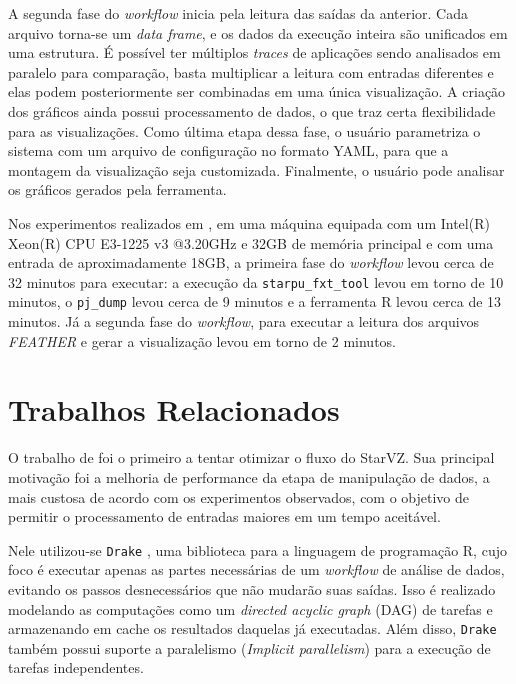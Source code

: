 A segunda fase do \emph{workflow} inicia pela leitura das saídas da anterior. 
Cada arquivo
torna-se um \emph{data frame}, e os dados da execução inteira são unificados em 
uma estrutura.
É possível ter múltiplos \emph{traces} de aplicações sendo analisados em 
paralelo
para comparação, basta multiplicar a leitura com entradas diferentes e 
elas podem posteriormente ser combinadas em uma única visualização. A criação 
dos gráficos ainda 
possui processamento de dados, o que traz certa flexibilidade para as 
visualizações. Como última etapa dessa fase, o usuário 
parametriza o sistema com um arquivo de configuração no formato YAML, para que 
a 
montagem da visualização seja customizada. Finalmente, o usuário pode analisar 
os gráficos gerados pela ferramenta.

Nos experimentos realizados em \citet{ref:starvz}, em uma máquina equipada com 
um Intel(R) Xeon(R) 
CPU E3-1225 v3 @3.20GHz e 32GB de memória principal e com uma entrada de 
aproximadamente 18GB, a 
primeira fase do \emph{workflow} levou cerca de 32 minutos para executar: a 
execução da \texttt{starpu\_fxt\_tool}
levou em torno de 10 minutos, o \texttt{pj\_dump} levou cerca de 9 minutos e a 
ferramenta R levou cerca de 13
minutos. Já a segunda fase do \emph{workflow}, para executar a leitura dos 
arquivos \emph{FEATHER} e gerar
a visualização levou em torno de 2 minutos.



\section{Trabalhos Relacionados}\label{sect:related-work}

O trabalho de \citet{ref:drakestarvz} foi o primeiro a tentar otimizar o fluxo 
do StarVZ. 
Sua principal motivação foi a melhoria de performance da etapa de manipulação 
de 
dados, a mais
custosa de acordo com os experimentos observados, com o objetivo de permitir o 
processamento de 
entradas maiores em um tempo aceitável.

Nele utilizou-se \texttt{Drake} \cite{ref:drake}, uma biblioteca para a 
linguagem de programação R, cujo foco é executar apenas as 
partes necessárias de um \emph{workflow} de análise de dados, evitando os 
passos 
desnecessários que não mudarão
suas saídas. Isso é realizado modelando as computações como um \emph{directed 
acyclic graph} (DAG) de tarefas e 
armazenando em cache os resultados daquelas já executadas. Além disso, 
\texttt{Drake} também possui suporte a paralelismo
(\emph{Implicit parallelism}) para a execução de tarefas independentes.

